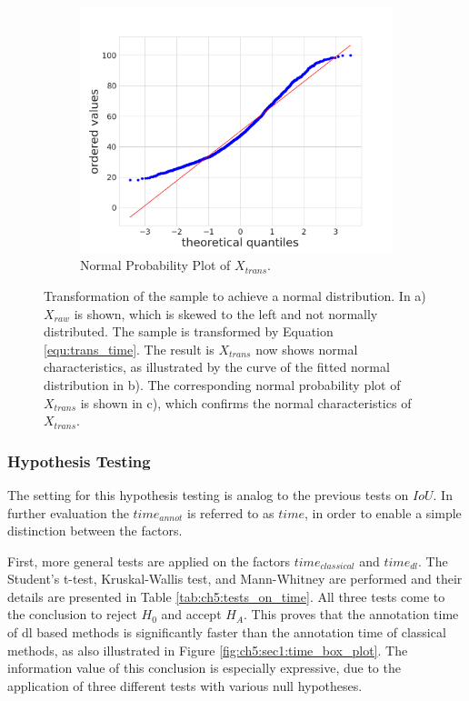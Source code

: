 \begin{figure} [h]
\begin{subfigure}[t]{0.3\textwidth}
	\end{subfigure}
	\hfill
	\begin{subfigure}[t]{0.3\textwidth}
		\centering
		\includegraphics[width=\textwidth]{figures/chap51_time_probplot.png}
		\caption{
			Normal Probability Plot of $X_{trans}$.
		}\label{fig:ch5:sec1:time_probplot}
	\end{subfigure}
	\caption[Sample Transformation $ time $]{
		Transformation of the sample to achieve a normal distribution.
		In a) $X_{raw}$ is shown, which is skewed to the left and not normally distributed.
		The sample is transformed by Equation \ref{equ:trans_time}.
		The result is $X_{trans}$ now shows normal characteristics, as illustrated by the curve of the fitted normal distribution in b).
		The corresponding normal probability plot of $X_{trans}$ is shown in c), which confirms the normal characteristics of $X_{trans}$.
	}\label{fig:ch5:sec1:time_transformation_iou}
\end{figure}

\subsubsection{Hypothesis Testing}

The setting for this hypothesis testing is analog to the previous tests on $IoU$.
In further evaluation the $time_{annot}$ is referred to as $time$, in order to enable a simple distinction between the factors.

First, more general tests are applied on the factors $time_{classical}$ and $time_{dl}$.
The Student's t-test, Kruskal-Wallis test, and Mann-Whitney are performed and their details are presented in Table \ref{tab:ch5:tests_on_time}.
All three tests come to the conclusion to reject $H_{0}$ and accept $H_{A}$.
This proves that the annotation time of \gls{dl} based methods is significantly faster than the annotation time of classical methods, as also illustrated in Figure \ref{fig:ch5:sec1:time_box_plot}.
The information value of this conclusion is especially expressive, due to the application of three different tests with various null hypotheses.

